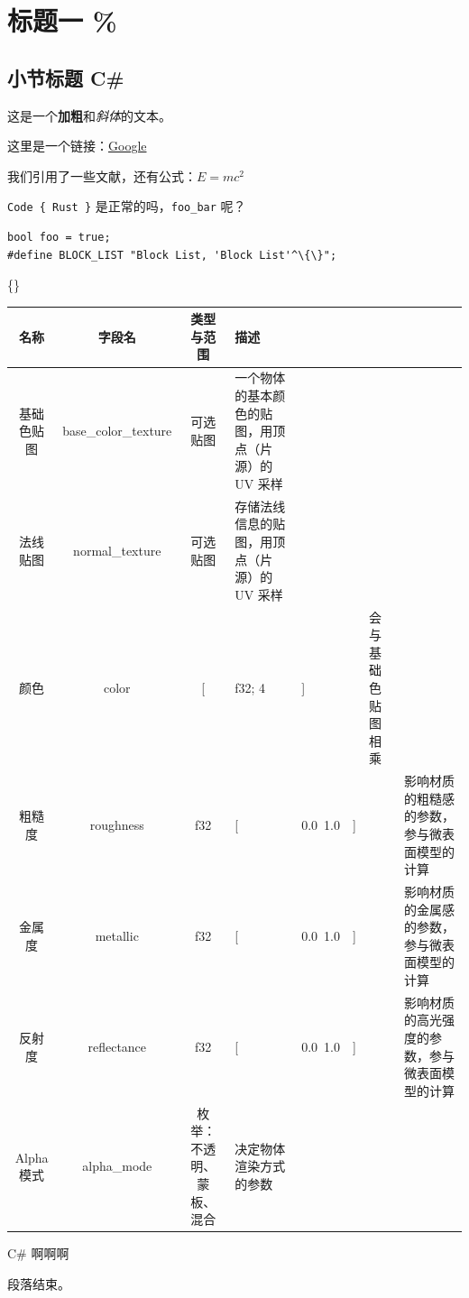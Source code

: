 \chapter{标题一 {\%}}
\section{小节标题 C\#}
这是一个\textbf{加粗}和\textit{斜体}的文本。

这里是一个链接：\href{https://www.google.com}{Google}

我们引用了一些文献\cite{foo}，还有公式：$E = mc^2$

\texttt{Code \{ Rust \}} 是正常的吗，\texttt{foo\_bar} 呢？

\begin{lstlisting}
bool foo = true;
#define BLOCK_LIST "Block List, 'Block List'^\{\}";
\end{lstlisting}
\{\}
\begin{tabular}{|c|c|c|} \hline
名称 & 字段名 & 类型与范围 & 描述 \\ \hline
基础色贴图 & base\_color\_texture & 可选贴图 & 一个物体的基本颜色的贴图，用顶点（片源）的 UV 采样 \\ \hline
法线贴图 & normal\_texture & 可选贴图 & 存储法线信息的贴图，用顶点（片源）的 UV 采样 \\ \hline
颜色 & color & [ & f32; 4 & ] &  & 会与基础色贴图相乘 \\ \hline
粗糙度 & roughness & f32  & [ & 0.0~1.0 & ] &  & 影响材质的粗糙感的参数，参与微表面模型的计算 \\ \hline
金属度 & metallic & f32  & [ & 0.0~1.0 & ] &  & 影响材质的金属感的参数，参与微表面模型的计算 \\ \hline
反射度 & reflectance & f32  & [ & 0.0~1.0 & ] &  & 影响材质的高光强度的参数，参与微表面模型的计算 \\ \hline
Alpha 模式 & alpha\_mode & 枚举：不透明、蒙板、混合 & 决定物体渲染方式的参数 \\ \hline
\end{tabular}

C\# 啊啊啊

段落结束。

